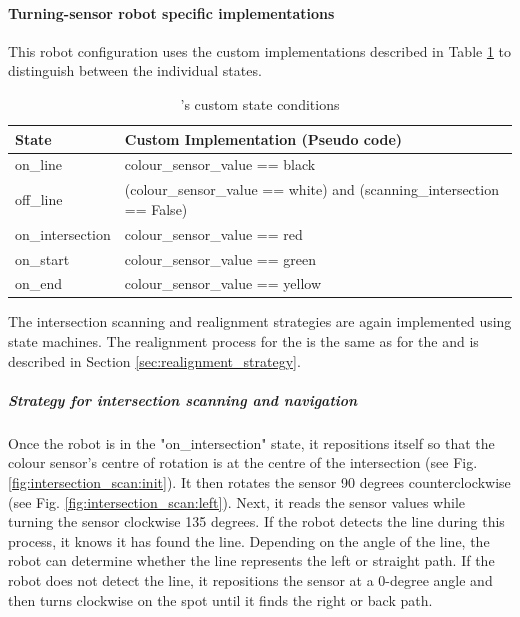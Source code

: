 \paragraph{Turning-sensor robot specific implementations}

This robot configuration uses the custom implementations described in Table \ref{tab:custom_state_turning_robot} to distinguish between the individual states.

\begin{table}[hbt!]
\caption{\TurningSensorRobot's custom state conditions}
\label{tab:custom_state_turning_robot}
\centering
\begin{tabular}{l|p{\linewidth-4cm}}
\textbf{State}   & \textbf{Custom Implementation (Pseudo code)}                        \\ 
\hline
on\_line         & colour\_sensor\_value == black                                         \\
off\_line        & (colour\_sensor\_value == white) and (scanning\_intersection == False) \\
on\_intersection & colour\_sensor\_value == red       \\
on\_start        & colour\_sensor\_value == green                                         \\
on\_end          & colour\_sensor\_value == yellow                                    
\end{tabular}

\end{table}

The intersection scanning and realignment strategies are again implemented using state machines. The realignment process for the \turningSensorRobot is the same as for the \fixedSensorRobot and is described in Section \ref{sec:realignment_strategy}.

\subparagraph{Strategy for intersection scanning and navigation} \label{sec:turning_intersection_scanning}

Once the robot is in the "on\_intersection" state, it repositions itself so that the colour sensor's centre of rotation is at the centre of the intersection (see Fig. \ref{fig:intersection_scan:init}). It then rotates the sensor 90 degrees counterclockwise (see Fig. \ref{fig:intersection_scan:left}). Next, it reads the sensor values while turning the sensor clockwise 135 degrees. If the robot detects the line during this process, it knows it has found the line. Depending on the angle of the line, the robot can determine whether the line represents the left or straight path. If the robot does not detect the line, it repositions the sensor at a 0-degree angle and then turns clockwise on the spot until it finds the right or back path.

